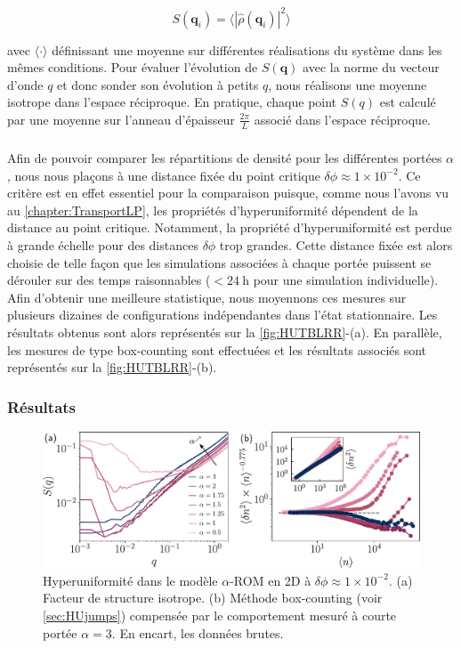 \begin{equation}
	S(\mathbf{q}_i) = \langle|\hat{\rho}(\mathbf{q}_i)|^2\rangle
\end{equation}

\noindent avec $\langle \cdot \rangle$ définissant une moyenne sur différentes réalisations du système dans les mêmes conditions. Pour évaluer l'évolution de $S(\mathbf{q})$ avec la norme du vecteur d'onde $q$ et donc sonder son évolution à petits $q$, nous réalisons une moyenne isotrope dans l'espace réciproque. En pratique, chaque point $S(q)$ est calculé par une moyenne sur l'anneau d'épaisseur $\frac{2\pi}{L}$ associé dans l'espace réciproque.

\subparagraph{}Afin de pouvoir comparer les répartitions de densité pour les différentes portées $\alpha$, nous nous plaçons à une distance fixée du point critique $\delta\phi \approx 1\times 10^{-2}$. Ce critère est en effet essentiel pour la comparaison puisque, comme nous l'avons vu au \autoref{chapter:TransportLP}, les propriétés d'hyperuniformité dépendent de la distance au point critique. Notamment, la propriété d'hyperuniformité est perdue à grande échelle pour des distances $\delta\phi$ trop grandes. Cette distance fixée est alors choisie de telle façon que les simulations associées à chaque portée puissent se dérouler sur des temps raisonnables ($<24~\text{h}$ pour une simulation individuelle). Afin d'obtenir une meilleure statistique, nous moyennons ces mesures sur plusieurs dizaines de configurations indépendantes dans l'état stationnaire. Les résultats obtenus sont alors représentés sur la \autoref{fig:HUTBLRR}-(a). En parallèle, les mesures de type box-counting sont effectuées et les résultats associés sont représentés sur la \autoref{fig:HUTBLRR}-(b).

\subsubsection{Résultats}

\begin{figure}[h]
	\centering
	\includegraphics[width=\textwidth]{Chapitre3/Figures/HU/HUTBLRR.pdf}
	\caption{Hyperuniformité dans le modèle $\alpha$-ROM en 2D à $\delta\phi \approx 1\times 10^{-2}$. (a) Facteur de structure isotrope. (b) Méthode box-counting (voir \autoref{sec:HUjumps}) compensée par le comportement mesuré à courte portée $\alpha = 3$. En encart, les données brutes.}
	\label{fig:HUTBLRR}
\end{figure}

